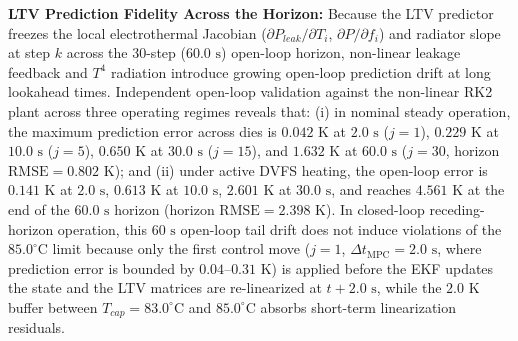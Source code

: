 \documentclass[a4paper,fleqn]{cas-dc}
\begin{document}
\textbf{LTV Prediction Fidelity Across the Horizon:}
Because the LTV predictor freezes the local electrothermal Jacobian ($\partial P_{leak}/\partial T_i$, $\partial P/\partial f_i$) and radiator slope at step $k$ across the 30-step ($60.0\text{ s}$) open-loop horizon, non-linear leakage feedback and $T^4$ radiation introduce growing open-loop prediction drift at long lookahead times. Independent open-loop validation against the non-linear RK2 plant across three operating regimes reveals that: (i) in nominal steady operation, the maximum prediction error across dies is $0.042\text{ K}$ at $2.0\text{ s}$ ($j=1$), $0.229\text{ K}$ at $10.0\text{ s}$ ($j=5$), $0.650\text{ K}$ at $30.0\text{ s}$ ($j=15$), and $1.632\text{ K}$ at $60.0\text{ s}$ ($j=30$, horizon $\mathrm{RMSE} = 0.802\text{ K}$); and (ii) under active DVFS heating, the open-loop error is $0.141\text{ K}$ at $2.0\text{ s}$, $0.613\text{ K}$ at $10.0\text{ s}$, $2.601\text{ K}$ at $30.0\text{ s}$, and reaches $4.561\text{ K}$ at the end of the $60.0\text{ s}$ horizon (horizon $\mathrm{RMSE} = 2.398\text{ K}$). In closed-loop receding-horizon operation, this $60\text{ s}$ open-loop tail drift does not induce violations of the $85.0^\circ\text{C}$ limit because only the first control move ($j=1$, $\Delta t_{\text{MPC}} = 2.0\text{ s}$, where prediction error is bounded by $0.04\text{--}0.31\text{ K}$) is applied before the EKF updates the state and the LTV matrices are re-linearized at $t + 2.0\text{ s}$, while the $2.0\text{ K}$ buffer between $T_{cap} = 83.0^\circ\text{C}$ and $85.0^\circ\text{C}$ absorbs short-term linearization residuals.
\end{document}
